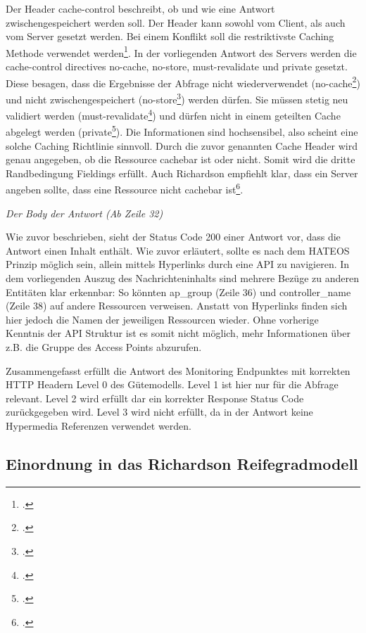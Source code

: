 Der Header cache-control beschreibt, ob und wie eine Antwort zwischengespeichert werden soll. Der Header kann sowohl vom Client, als auch vom Server gesetzt werden. Bei einem Konflikt soll die restriktivste Caching Methode verwendet werden\footcite[S. 77]{berners-lee_univeral_1996}. In der vorliegenden Antwort des Servers werden die cache-control directives no-cache, no-store, must-revalidate und private gesetzt. Diese besagen, dass die Ergebnisse der Abfrage nicht wiederverwendet (no-cache\footcite[S. 109]{berners-lee_univeral_1996}) und nicht zwischengespeichert (no-store\footcite[S. 110]{berners-lee_univeral_1996}) werden dürfen. Sie müssen stetig neu validiert werden (must-revalidate\footcite[S. 113]{berners-lee_univeral_1996}) und dürfen nicht in einem geteilten Cache abgelegt werden (private\footcite[S. 109f]{berners-lee_univeral_1996}). Die Informationen sind hochsensibel, also scheint eine solche Caching Richtlinie sinnvoll. Durch die zuvor genannten Cache Header wird genau angegeben, ob die Ressource cachebar ist oder nicht. Somit wird die dritte Randbedingung Fieldings erfüllt. Auch Richardson empfiehlt klar, dass ein Server angeben sollte, dass eine Ressource nicht cachebar ist\footcite[S. 248]{richardson_restful_2007}.

\emph{Der Body der Antwort (Ab Zeile 32)}

Wie zuvor beschrieben, sieht der Status Code 200 einer Antwort vor, dass die Antwort einen Inhalt enthält. Wie zuvor erläutert, sollte es nach dem HATEOS Prinzip möglich sein, allein mittels Hyperlinks durch eine API zu navigieren. In dem vorliegenden Auszug des Nachrichteninhalts sind mehrere Bezüge zu anderen Entitäten klar erkennbar: So könnten ap\_group (Zeile 36) und controller\_name (Zeile 38) auf andere Ressourcen verweisen. Anstatt von Hyperlinks finden sich hier jedoch die Namen der jeweiligen Ressourcen wieder. Ohne vorherige Kenntnis der API Struktur ist es somit nicht möglich, mehr Informationen über z.B. die Gruppe des Access Points abzurufen.

Zusammengefasst erfüllt die Antwort des Monitoring Endpunktes mit korrekten HTTP Headern Level 0 des Gütemodells. Level 1 ist hier nur für die Abfrage relevant. Level 2 wird erfüllt dar ein korrekter Response Status Code zurückgegeben wird. Level 3 wird nicht erfüllt, da in der Antwort keine Hypermedia Referenzen verwendet werden.

\subsection{Einordnung in das Richardson Reifegradmodell}\label{subsection:einordnung-in-das-richardson-reifegradmodell}

